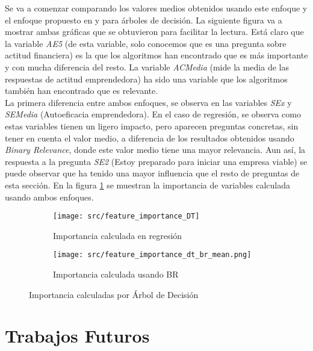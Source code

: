 Se va a comenzar comparando los valores medios obtenidos usando este enfoque y el enfoque propuesto en  y para árboles de decisión.
La siguiente figura va a mostrar ambas gráficas que se obtuvieron para facilitar la lectura.
Está claro que la variable \textit{AE5} (de esta variable, solo conocemos que es una pregunta sobre actitud financiera) es la que los algoritmos han encontrado que es más importante y con mucha diferencia del resto. La variable \textit{ACMedia} (mide la media de las respuestas de actitud emprendedora) ha sido una variable que los algoritmos también han encontrado que es relevante.\\
La primera diferencia entre ambos enfoques, se observa en las variables \textit{SEx} y \textit{SEMedia} (Autoeficacia emprendedora).
En el caso de regresión, se observa como estas variables tienen un ligero impacto, pero aparecen preguntas concretas, sin tener en cuenta el valor medio, a diferencia de los resultados obtenidos usando \textit{Binary Relevance}, donde este valor medio tiene una mayor relevancia. Aun así, la respuesta a la pregunta \textit{SE2} (Estoy preparado para iniciar una empresa viable) se puede observar que ha tenido una mayor influencia que el resto de preguntas de esta sección.
En la figura \ref{fig:dt_ft_cmp1} se muestran la importancia de variables calculada usando ambos enfoques.
\begin{figure}[H]
	\centering
	\begin{subfigure}[b]{\textwidth}
		\centering
		\texttt{[image: src/feature\_importance\_DT]}
		\caption{Importancia calculada en regresión}
	\end{subfigure}
	
	\begin{subfigure}[b]{\textwidth}
		\centering
		\texttt{[image: src/feature\_importance\_dt\_br\_mean.png]}
		\caption{Importancia calculada usando BR}
	\end{subfigure}
	\caption{Importancia calculadas por Árbol de Decisión}
	\label{fig:dt_ft_cmp1}
\end{figure}



\chapter{Trabajos Futuros}